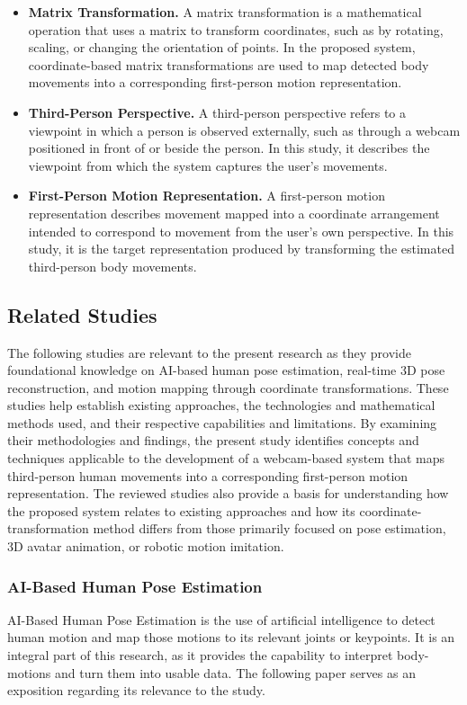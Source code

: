 \documentclass[12pt,a4paper]{article}
\begin{document}
\begin{itemize}
    \item \textbf{Matrix Transformation.} A matrix transformation is a mathematical operation that uses a matrix to transform coordinates, such as by rotating, scaling, or changing the orientation of points. In the proposed system, coordinate-based matrix transformations are used to map detected body movements into a corresponding first-person motion representation.

    \item \textbf{Third-Person Perspective.} A third-person perspective refers to a viewpoint in which a person is observed externally, such as through a webcam positioned in front of or beside the person. In this study, it describes the viewpoint from which the system captures the user's movements.

    \item \textbf{First-Person Motion Representation.} A first-person motion representation describes movement mapped into a coordinate arrangement intended to correspond to movement from the user's own perspective. In this study, it is the target representation produced by transforming the estimated third-person body movements.
\end{itemize}


\subsection{Related Studies}
The following studies are relevant to the present research as they provide foundational knowledge on AI-based human pose estimation, real-time 3D pose reconstruction, and motion mapping through coordinate transformations. These studies help establish existing approaches, the technologies and mathematical methods used, and their respective capabilities and limitations. By examining their methodologies and findings, the present study identifies concepts and techniques applicable to the development of a webcam-based system that maps third-person human movements into a corresponding first-person motion representation. The reviewed studies also provide a basis for understanding how the proposed system relates to existing approaches and how its coordinate-transformation method differs from those primarily focused on pose estimation, 3D avatar animation, or robotic motion imitation.

    \subsubsection{AI-Based Human Pose Estimation}
    AI-Based Human Pose Estimation is the use of artificial intelligence to detect human motion and map those motions to its relevant joints or keypoints. It is an integral part of this research, as it provides the capability to interpret body-motions and turn them into usable data. The following paper serves as an exposition regarding its relevance to the study.
\end{document}
